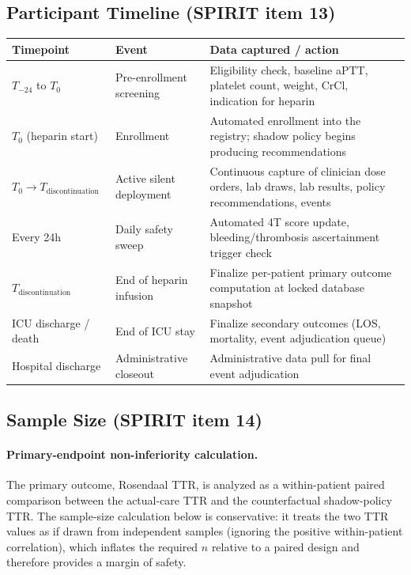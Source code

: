 \documentclass[11pt]{article}
\begin{document}
\subsection{Participant Timeline (SPIRIT item 13)}

\begin{longtable}{@{}p{3.5cm}p{5cm}p{6.5cm}@{}}
\toprule
\textbf{Timepoint} & \textbf{Event} & \textbf{Data captured / action} \\
\midrule
\endhead
$T_{-24}$ to $T_0$ & Pre-enrollment screening & Eligibility check, baseline aPTT, platelet count, weight, CrCl, indication for heparin \\
$T_0$ (heparin start) & Enrollment & Automated enrollment into the registry; shadow policy begins producing recommendations \\
$T_0 \to T_{\mathrm{discontinuation}}$ & Active silent deployment & Continuous capture of clinician dose orders, lab draws, lab results, policy recommendations, events \\
Every 24h & Daily safety sweep & Automated 4T score update, bleeding/thrombosis ascertainment trigger check \\
$T_{\mathrm{discontinuation}}$ & End of heparin infusion & Finalize per-patient primary outcome computation at locked database snapshot \\
ICU discharge / death & End of ICU stay & Finalize secondary outcomes (LOS, mortality, event adjudication queue) \\
Hospital discharge & Administrative closeout & Administrative data pull for final event adjudication \\
\bottomrule
\end{longtable}

\subsection{Sample Size (SPIRIT item 14)}
\label{sec:sample_size}

\paragraph{Primary-endpoint non-inferiority calculation.}

The primary outcome, Rosendaal TTR, is analyzed as a within-patient paired comparison between the actual-care TTR and the counterfactual shadow-policy TTR. The sample-size calculation below is conservative: it treats the two TTR values as if drawn from independent samples (ignoring the positive within-patient correlation), which inflates the required $n$ relative to a paired design and therefore provides a margin of safety.
\end{document}
